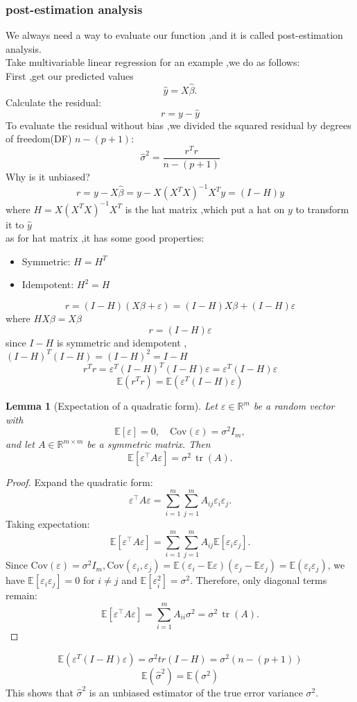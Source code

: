 \documentclass[a4paper, 12pt]{article}
\newtheorem{lemma}{Lemma}
\newcommand{\E}{\mathbb{E}}      %
\begin{document}
\subsubsection{post-estimation analysis}
We always need a way to evaluate our function ,and it is called post-estimation analysis.\\
Take multivariable linear regression for an example ,we do as follows:\\
First ,get our predicted values
$$\hat y=X\hat \beta .$$
Calculate the residual:
$$r=y- \hat y$$
To evaluate the residual without bias ,we divided the squared residual by degrees of freedom(DF) $n-(p+1)$:
$$\hat \sigma^2 = \frac{r^Tr}{n-(p+1)}$$
Why is it unbiased?
$$r=y-X\hat \beta= y- X(X^TX)^{-1}X^Ty =(I-H)y$$
where $H=X(X^TX)^{-1}X^T$ is the hat matrix ,which put a hat on $y$ to transform it to $\hat y$\\
as for hat matrix ,it has some good properties:\begin{itemize}
  \item Symmetric: $H=H^T$
  \item Idempotent: $H^2=H$ 
\end{itemize}
$$r= (I-H)(X\beta+\varepsilon)=(I-H)X\beta +(I-H)\varepsilon $$
where $HX\beta = X\beta$
$$r = (I-H)\varepsilon$$
since $I-H$ is symmetric and idempotent ,$(I-H)^T(I-H) = (I-H)^2 =I-H$
$$r^Tr =\varepsilon^T(I-H)^T(I-H)\varepsilon =\varepsilon^T(I-H)\varepsilon $$
$$\mathbb{E}(r^Tr) = \mathbb{E}(\varepsilon^T (I-H)\varepsilon)$$
\begin{lemma}[Expectation of a quadratic form]
Let $\varepsilon \in \mathbb{R}^m$ be a random vector with
\[
\mathbb{E}[\varepsilon] = 0, \quad \text{Cov}(\varepsilon) = \sigma^2 I_m,
\]
and let $A \in \mathbb{R}^{m \times m}$ be a symmetric matrix. Then
\[
\mathbb{E}[\varepsilon^\top A \varepsilon] = \sigma^2 \, \operatorname{tr}(A).
\]
\end{lemma}

\begin{proof}
Expand the quadratic form:
\[
\varepsilon^\top A \varepsilon = \sum_{i=1}^m \sum_{j=1}^m A_{ij} \varepsilon_i \varepsilon_j.
\]
Taking expectation:
\[
\mathbb{E}[\varepsilon^\top A \varepsilon] = \sum_{i=1}^m \sum_{j=1}^m A_{ij} \mathbb{E}[\varepsilon_i \varepsilon_j].
\]
Since $\text{Cov}(\varepsilon) = \sigma^2 I_m , \text{Cov}(\varepsilon_i,\varepsilon_j)= \E (\varepsilon_i- \E \varepsilon)(\varepsilon_j -\E \varepsilon_j)=\E(\varepsilon_i\varepsilon_j) $, we have $\mathbb{E}[\varepsilon_i \varepsilon_j] = 0$ for $i \neq j$ and $\mathbb{E}[\varepsilon_i^2] = \sigma^2$. Therefore, only diagonal terms remain:
\[
\mathbb{E}[\varepsilon^\top A \varepsilon] = \sum_{i=1}^m A_{ii} \sigma^2 = \sigma^2 \, \operatorname{tr}(A).
\]
\end{proof}
$$\E (\varepsilon^T(I-H)\varepsilon)=\sigma^2 tr(I-H) =\sigma^2 (n -(p+1))$$
$$\mathbb{E} (\hat{\sigma}^2)= \E(\sigma^2)$$
This shows that $\hat \sigma^2$ is an unbiased estimator of the true error variance $\sigma^2$.
\end{document}
